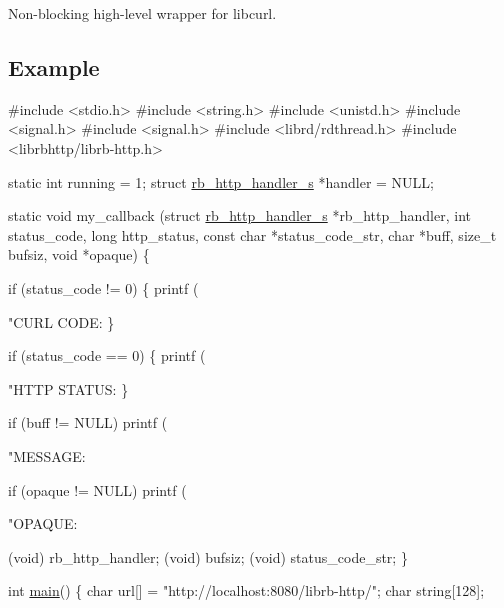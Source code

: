 Non-\/blocking high-\/level wrapper for libcurl.

\subsection*{Example}


\begin{DoxyCode}
\textcolor{preprocessor}{#include <stdio.h>}
\textcolor{preprocessor}{#include <string.h>}
\textcolor{preprocessor}{#include <unistd.h>}
\textcolor{preprocessor}{#include <signal.h>}
\textcolor{preprocessor}{#include <signal.h>}
\textcolor{preprocessor}{#include <librd/rdthread.h>}
\textcolor{preprocessor}{#include <librbhttp/librb-http.h>}

\textcolor{keyword}{static} \textcolor{keywordtype}{int} running = 1;
\textcolor{keyword}{struct }\hyperlink{structrb__http__handler__s}{rb\_http\_handler\_s} *handler = NULL;

\textcolor{keyword}{static} \textcolor{keywordtype}{void} my\_callback (\textcolor{keyword}{struct} \hyperlink{structrb__http__handler__s}{rb\_http\_handler\_s} *rb\_http\_handler,
                         \textcolor{keywordtype}{int} status\_code,
                         \textcolor{keywordtype}{long} http\_status,
                         \textcolor{keyword}{const} \textcolor{keywordtype}{char} *status\_code\_str,
                         \textcolor{keywordtype}{char} *buff,
                         \textcolor{keywordtype}{size\_t} bufsiz,
                         \textcolor{keywordtype}{void} *opaque) \{

    \textcolor{keywordflow}{if} (status\_code != 0) \{
        printf (\textcolor{stringliteral}{"CURL CODE: %
    \}

    \textcolor{keywordflow}{if} (status\_code == 0) \{
        printf (\textcolor{stringliteral}{"HTTP STATUS: %
    \}

    \textcolor{keywordflow}{if} (buff != NULL)
        printf (\textcolor{stringliteral}{"MESSAGE: %

    \textcolor{keywordflow}{if} (opaque != NULL)
        printf (\textcolor{stringliteral}{"OPAQUE: %

    (void) rb\_http\_handler;
    (void) bufsiz;
    (void) status\_code\_str;
\}

\textcolor{keywordtype}{int} \hyperlink{rb__http__handler__example_8c_ae66f6b31b5ad750f1fe042a706a4e3d4}{main}() \{
    \textcolor{keywordtype}{char} url[] = \textcolor{stringliteral}{"http://localhost:8080/librb-http/"};
    \textcolor{keywordtype}{char} \textcolor{keywordtype}{string}[128];

}}}}
\end{DoxyCode}
